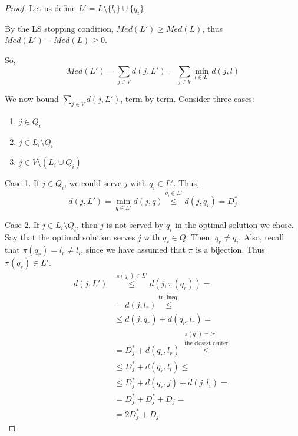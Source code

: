     \begin{proof}
        Let us define $L' = L \setminus \{l_i\} \cup \{q_i\}$.

        By the LS stopping condition, $Med(L') \geq Med(L)$, thus $Med(L') - Med(L) \geq 0$.

        So,
        \[ Med(L') = \sum_{j \in V} d(j,L') = \sum_{j \in V} \min_{l \in L'} d(j,l) \]

        We now bound $\sum_{j \in V} d(j,L')$, term-by-term.
        Consider three cases:
        \begin{enumerate}
            \item $j \in Q_i$
            \item $j \in L_i \setminus Q_i$
            \item $j \in V \setminus (L_i \cup Q_i)$
        \end{enumerate}

        Case 1. If $j \in Q_i$, we could serve $j$ with $q_i \in L'$. Thus,
        \begin{equation*}
            d(j,L') = \min_{q \in L'} d(j,q) \overset{q_i \in L'}{\leq} d(j,q_i) = D_j^*
        \end{equation*}

        Case 2. If $j \in L_i \setminus Q_i$, then $j$ is not served by $q_i$ in the optimal solution we chose.
        Say that the optimal solution serves $j$ with $q_r \in Q$.
        Then, $q_r \neq q_i$. Also, recall that $\pi(q_r) = l_r \neq l_i$, since we have assumed that $\pi$ is a bijection. Thus $\pi(q_r) \in L'$.
        \begin{equation*}
            \begin{split}
                d(j,L') &\overset{\pi(q_r)\in L'}{\leq} d(j, \pi(q_r)) =\\
                    &= d(j,l_r) \overset{\text{tr. ineq.}}{\leq}\\
                    &\leq d(j,q_r) + d(q_r, l_r) =\\
                    &= D_j^* + d(q_r, l_r) \overset{\substack{\pi(q_r) = lr\\ \text{the closest center}}}{\leq}\\
                    &\leq D_j^* + d(q_r, l_i) \leq\\
                    &\leq D_j^* + d(q_r, j) + d(j, l_i) =\\
                    &= D_j^* + D_j^* + D_j =\\
                    &= 2D_j^* + D_j
            \end{split}
        \end{equation*}


\end{proof}
